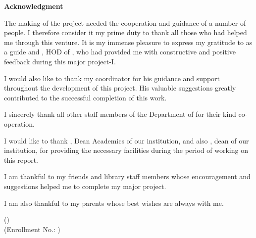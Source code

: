 \thispagestyle{empty}
\vspace*{0.4cm}
\begin{center}
{\fontsize{22}{28}\selectfont\bfseries Acknowledgment\par}
\end{center}
\vspace{0.7cm}
{\setlength{\parskip}{8pt}
\noindent The making of the project needed the cooperation and guidance of a number of people. I therefore consider it my prime duty to thank all those who had helped me through this venture. It is my immense pleasure to express my gratitude to \textbf{\SupervisorName} as a guide and \textbf{\HODName}, HOD of \DepartmentName, who had provided me with constructive and positive feedback during this major project-I.

\noindent I would also like to thank my coordinator \textbf{\CoordinatorName} for his guidance and support throughout the development of this project. His valuable suggestions greatly contributed to the successful completion of this work.

\noindent I sincerely thank all other staff members of the Department of \DepartmentName{} for their kind co-operation.

\noindent I would like to thank \textbf{\DeanAcademicsName}, Dean Academics of our institution, and also \textbf{\DeanName}, dean of our institution, for providing the necessary facilities during the period of working on this report.

\noindent I am thankful to my friends and library staff members whose encouragement and suggestions helped me to complete my major project.

\noindent I am also thankful to my parents whose best wishes are always with me.\par}

\vspace{0.6cm}
{
\begin{flushright}
(\StudentName)\\[0.5cm]
(Enrollment No.: \EnrollmentNo)
\end{flushright}}
\clearpage
